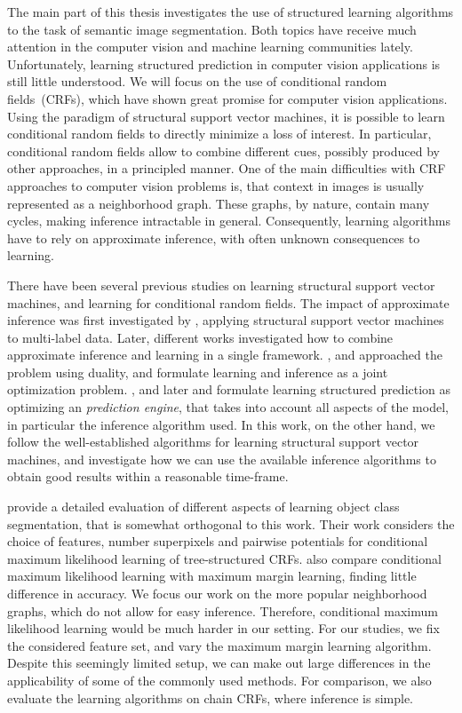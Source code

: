 The main part of this thesis investigates the use of structured learning
algorithms to the task of semantic image segmentation. Both topics have receive
much attention in the computer vision and machine learning communities lately.
Unfortunately, learning structured prediction in computer vision applications
is still little understood.
We will focus on the use of conditional random fields~(CRFs), which have shown
great promise for computer vision applications. Using the paradigm of
structural support vector machines, it is possible to learn conditional random
fields to directly minimize a loss of interest. In particular, conditional
random fields allow to combine different cues, possibly produced by other
approaches, in a principled manner. One of the main difficulties with CRF
approaches to computer vision problems is, that context in images is usually
represented as a neighborhood graph.  These graphs, by nature, contain many
cycles, making inference intractable in general. Consequently, learning algorithms
have to rely on approximate inference, with often unknown consequences to learning.

There have been several previous studies on learning structural support vector machines,
and learning for conditional random fields. The impact of approximate inference was first
investigated by \citet{finley2008training}, applying structural support vector machines
to multi-label data. Later, different works investigated how to combine approximate inference and
learning in a single framework. \citet{meshi2010learning, komodakis2011efficient}, and \citet{hazan2010primal} approached
the problem using duality, and formulate learning and inference as a joint optimization problem.
\citet{stoyanov2011empirical}, and later \citet{jancsarylearning} and  \citet{krahenbuhlparameter} formulate learning
structured prediction as optimizing an \emph{prediction engine}, that takes into account all aspects
of the model, in particular the inference algorithm used.
In this work, on the other hand, we follow the well-established algorithms for learning structural
support vector machines, and investigate how we can use the available inference algorithms to
obtain good results within a reasonable time-frame.

\citet{nowozin2010parameter} provide a detailed evaluation of different aspects of learning object class
segmentation, that is somewhat orthogonal to this work. Their work considers the choice of features,
number superpixels and pairwise potentials for conditional maximum likelihood learning of tree-structured CRFs.
\citet{nowozin2010parameter} also compare conditional maximum likelihood learning with maximum margin learning,
finding little difference in accuracy.
We focus our work on the more popular neighborhood graphs, which do not allow for easy inference.
Therefore, conditional maximum likelihood learning would be much harder in our setting. For our studies,
we fix the considered feature set, and vary the maximum margin learning algorithm. Despite
this seemingly limited setup, we can make out large differences in the applicability of
some of the commonly used methods. For comparison, we also evaluate the learning algorithms
on chain CRFs, where inference is simple.



